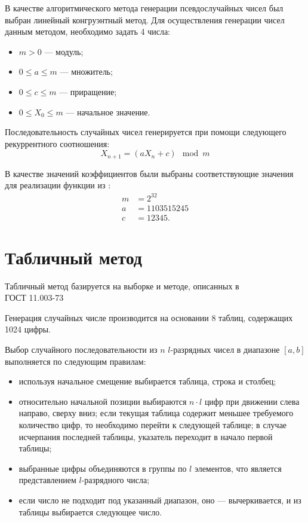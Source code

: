 В качестве алгоритмического метода генерации псевдослучайных чисел был выбран
линейный конгруэнтный метод. Для осуществления генерации чисел данным методом,
необходимо задать 4 числа:
\begin{itemize}
    \item $m > 0$ --- модуль;
    \item $0 \leq a	\leq m$ --- множитель;
    \item $0 \leq c \leq m$ --- приращение;
    \item $0 \leq X_0 \leq m$ --- начальное значение.
\end{itemize}

Последовательность случайных чисел генерируется при помощи следующего
рекуррентного соотношения:
\begin{equation*}
    X_{n+1} = (a X_n + c) \mod m
\end{equation*}

В качестве значений коэффициентов были выбраны соответствующие значения
для реализации функции  из :
\begin{align*}
    m & = 2 ^ {32} \\
    a & = 1103515245 \\
    c & = 12345.
\end{align*}

\section*{Табличный метод}

Табличный метод базируется на выборке и методе, описанных в\\ГОСТ 11.003-73

Генерация случайных числе производится на основании 8 таблиц, содержащих 1024
цифры.

Выбор случайного последовательности из $n$ $l$-разрядных чисел в диапазоне
$[a, b]$ выполняется по следующим правилам:
\begin{itemize}
    \item используя начальное смещение выбирается таблица, строка
          и столбец;
    \item относительно начальной позиции выбираются $n \cdot l$ цифр при
          движении слева направо, сверху вниз; если текущая таблица содержит
          меньшее требуемого количество цифр, то необходимо перейти к следующей
          таблице; в случае исчерпания последней таблицы, указатель переходит
          в начало первой таблицы;
    \item выбранные цифры объединяются в группы по $l$ элементов, что
          является представлением $l$-разрядного числа;
    \item если число не подходит под указанный диапазон, оно --- вычеркивается,
          и из таблицы выбирается следующее число.
\end{itemize}

